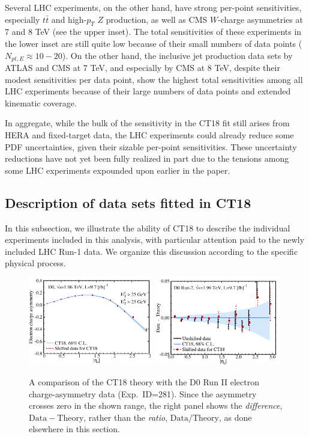 Several LHC experiments, on the other hand, have strong per-point sensitivities,
especially $t\bar t$ and high-$p_T$ $Z$ production, as
well as CMS $W$-charge asymmetries at 7 and 8 TeV (see the upper
inset). The total sensitivities of these experiments in the lower inset
are still quite low because of their small numbers of data points
($N_{pt,E}\approx 10-20$). On the other hand, the inclusive
jet production data sets
by ATLAS and CMS at 7 TeV, and especially by CMS at 8 TeV,
despite their modest sensitivities per data point, show the highest
total sensitivities among all LHC experiments because of their large
numbers of data points and extended kinematic coverage.

In aggregate, while the bulk of the sensitivity in the CT18 fit
still arises from HERA and fixed-target data, the LHC
experiments could already reduce some PDF uncertainties, given their
sizable per-point sensitivities. These uncertainty reductions have not
yet been fully realized in part due to the tensions among some LHC experiments
expounded upon earlier in the paper. 

%
\subsection{Description of data sets fitted in CT18}
\label{sec:Qualitydata}
%
%
In this subsection, we illustrate the ability of CT18 to describe the individual
experiments included in this analysis, with particular attention paid to the
newly included LHC Run-1 data. We organize this discussion according to the specific
physical process.


%
%
\begin{figure}[tb]
	\includegraphics[width=0.49\textwidth]{./fig/data_281_CT18_abs_ect.pdf}
	\includegraphics[width=0.49\textwidth]{./fig/data_281_CT18_DoT_v2_ect.pdf}
	\caption{
	A comparison of the CT18 theory with the D0 Run II electron charge-asymmetry data (Exp.~ID=281). Since the asymmetry crosses zero in the shown range, the right panel shows the {\it difference}, $\mathrm{Data}\!-\!\mathrm{Theory}$, rather than the {\it ratio}, $\mathrm{Data}/\mathrm{Theory}$, as done elsewhere in this section.
	}
\label{fig:281}
\end{figure}

